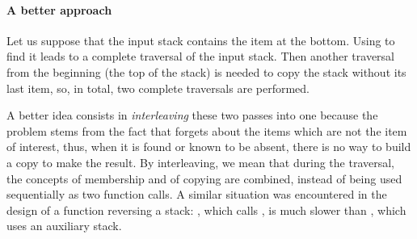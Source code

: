 \paragraph{A better approach}

Let us suppose that the input stack contains the item at the
bottom. Using  to find it leads to a complete traversal of
the input stack. Then another traversal from the beginning (the top of
the stack) is needed to copy the stack without its last item, so, in
total, two complete traversals are performed.

A better idea consists in \emph{interleaving} these two passes into
one because the problem stems from the fact that  forgets
about the items which are not the item of interest, thus, when it is
found or known to be absent, there is no way to build a copy to make
the result. By interleaving, we mean that during the traversal, the
concepts of membership and of copying are combined, instead of being
used sequentially as two function calls. A similar situation was
encountered in the design of a function reversing a stack:
, which calls , is much slower than
, which uses an auxiliary stack.

